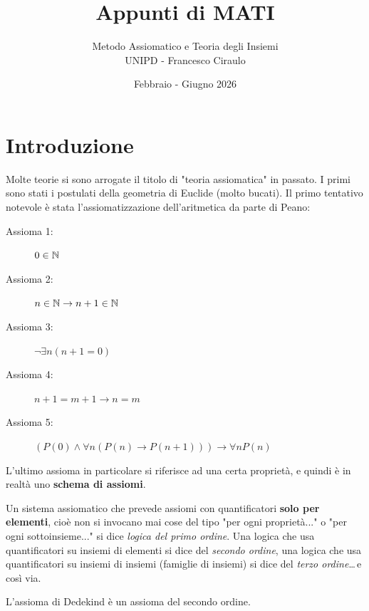 \documentclass[11pt]{scrartcl}
\begin{document}
	\title{Appunti di MATI}
	\subtitle{
		Metodo Assiomatico e Teoria degli Insiemi \\
		UNIPD - Francesco Ciraulo
	}
	\date{Febbraio - Giugno 2026}
	
	\maketitle
	
	\tableofcontents
	
	\newpage
	
	\section{Introduzione}
	
	Molte teorie si sono arrogate il titolo di "teoria assiomatica" in passato. I primi sono stati i postulati della geometria di Euclide (molto bucati). Il primo tentativo notevole è stata l'assiomatizzazione dell'aritmetica da parte di Peano:
	\begin{description}
		\item[Assioma 1:] $0\in\mathbb N$
		\item[Assioma 2:] $n\in\mathbb N \to n+1\in\mathbb N$
		\item[Assioma 3:] $\lnot\exists n (n+1=0)$
		\item[Assioma 4:] $n+1=m+1 \to n=m$
		\item[Assioma 5:] $\left(P(0)\land \forall n \left(P(n)\to P(n+1)\right)\right)\to \forall n P(n)$
	\end{description}
	L'ultimo assioma in particolare si riferisce ad una certa proprietà, e quindi è in realtà uno \textbf{schema di assiomi}. 
	\begin{definition}
		Un sistema assiomatico che prevede assiomi con quantificatori \textbf{solo per elementi}, cioè non si invocano mai cose del tipo "per ogni proprietà..." o "per ogni sottoinsieme..." si dice \textit{logica del primo ordine}. Una logica che usa quantificatori su insiemi di elementi si dice del \textit{secondo ordine}, una logica che usa quantificatori su insiemi di insiemi (famiglie di insiemi) si dice del \textit{terzo ordine}\dots \,e così via.
	\end{definition}
	
	\begin{example}
		L'assioma di Dedekind è un assioma del secondo ordine.
	\end{example}
	
	\newpage
	
\end{document}
